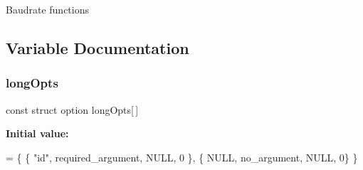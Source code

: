 Baudrate functions 

\subsection{Variable Documentation}
\mbox{\label{qbparam_8c_a091f2d9683d6ef802780b360f66bad67}} 
\subsubsection{long\+Opts}
{\footnotesize\ttfamily const struct option long\+Opts[$\,$]\hspace{0.3cm}{\ttfamily [static]}}

{\bfseries Initial value\+:}
\begin{DoxyCode}
= \{
    \{ \textcolor{stringliteral}{"id"}, required\_argument, NULL, 0 \},
    \{ NULL, no\_argument, NULL, 0\}
\}
\end{DoxyCode}
